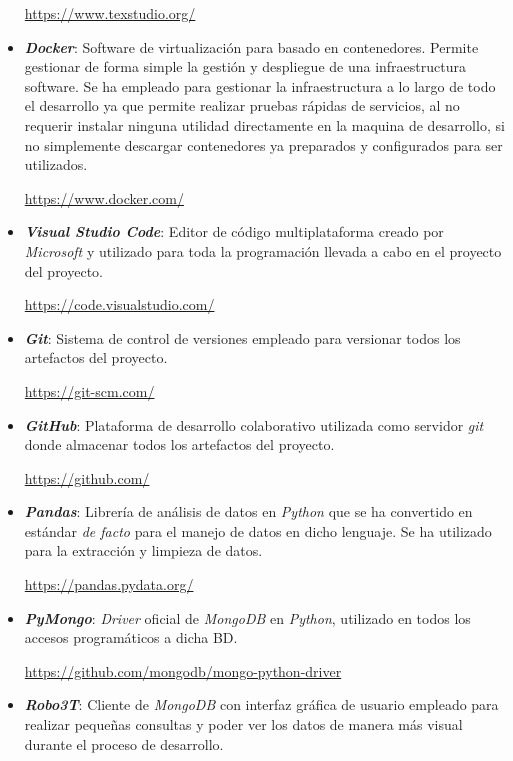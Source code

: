 \begin{itemize}
	\url{https://www.texstudio.org/}
	
	\item \textit{\textbf{Docker}}: Software de virtualización para basado en contenedores. Permite gestionar de forma simple la gestión y despliegue de una infraestructura software. Se ha empleado para gestionar la infraestructura a lo largo de todo el desarrollo ya que permite realizar pruebas rápidas de servicios, al no requerir instalar ninguna utilidad directamente en la maquina de desarrollo, si no simplemente descargar contenedores ya preparados y configurados para ser utilizados.
	
	\url{https://www.docker.com/}
	
	\item \textit{\textbf{Visual Studio Code}}: Editor de código multiplataforma creado por \textit{Microsoft} y utilizado para toda la programación llevada a cabo en el proyecto del proyecto.
	
	\url{https://code.visualstudio.com/}
	
	\item \textit{\textbf{Git}}: Sistema de control de versiones empleado para versionar todos los artefactos del proyecto.
	
	
	\url{https://git-scm.com/}
	
	\item \textit{\textbf{GitHub}}: Plataforma de desarrollo colaborativo utilizada como servidor \textit{git} donde almacenar todos los artefactos del proyecto.
	
	\url{https://github.com/}
	
	\item \textbf{\textit{Pandas}}: Librería de análisis de datos en \textit{Python} que se ha convertido en estándar \textit{de facto} para el manejo de datos en dicho lenguaje. Se ha utilizado para la extracción y limpieza de datos.
	
	\url{https://pandas.pydata.org/}
	
	\item \textit{\textbf{PyMongo}}: \textit{Driver} oficial de \textit{MongoDB} en \textit{Python}, utilizado en todos los accesos programáticos a dicha \acrshort{BD}.
	
	\url{https://github.com/mongodb/mongo-python-driver}
	
	\item \textit{\textbf{Robo3T}}: Cliente de \textit{MongoDB} con interfaz gráfica de usuario empleado para realizar pequeñas consultas y poder ver los datos de manera más visual durante el proceso de desarrollo.
	

\end{itemize}
